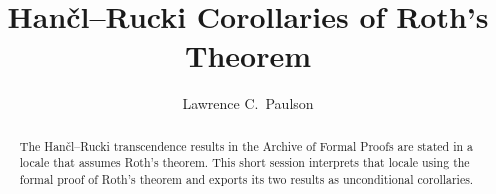 \documentclass[11pt,a4paper]{article}
\begin{document}
\title{Han\v{c}l--Rucki Corollaries of Roth's Theorem}
\author{Lawrence C.\ Paulson}
\maketitle

\begin{abstract}
The Han\v{c}l--Rucki transcendence results in the Archive of Formal
Proofs are stated in a locale that assumes Roth's theorem. This short
session interprets that locale using the formal proof of Roth's theorem
and exports its two results as unconditional corollaries.
\end{abstract}


\end{document}
